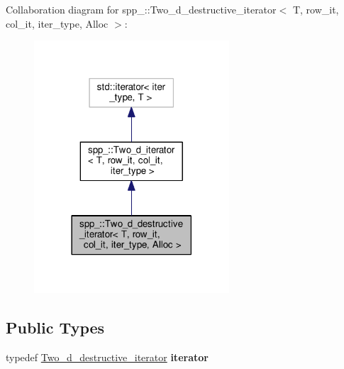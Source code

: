 Collaboration diagram for spp\+\_\+\+:\+:Two\+\_\+d\+\_\+destructive\+\_\+iterator$<$ T, row\+\_\+it, col\+\_\+it, iter\+\_\+type, Alloc $>$\+:\nopagebreak
\begin{figure}[H]
\begin{center}
\leavevmode
\includegraphics[width=206pt]{classspp___1_1_two__d__destructive__iterator__coll__graph}
\end{center}
\end{figure}
\subsection*{Public Types}
\begin{DoxyCompactItemize}
\item 
typedef \hyperlink{classspp___1_1_two__d__destructive__iterator}{Two\+\_\+d\+\_\+destructive\+\_\+iterator} {\bfseries iterator}\hypertarget{classspp___1_1_two__d__destructive__iterator_a8063ed3d98c4a9bedac8fd77d35cf240}{}\label{classspp___1_1_two__d__destructive__iterator_a8063ed3d98c4a9bedac8fd77d35cf240}

\end{DoxyCompactItemize}
